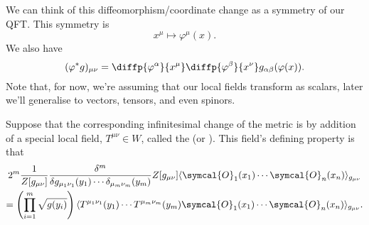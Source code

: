 \documentclass[fleqn]{NotesClass}
\newcommand{\quantumField}[1]{\symcal{#1}}
\DeclarePairedDelimiter{\correlator}{\langle}{\rangle}
\begin{document}
    We can think of this diffeomorphism/coordinate change as a symmetry of our QFT.
    This symmetry is
    \begin{equation}
        x^\mu \mapsto \varphi^\mu(x).
    \end{equation}
    We also have
    \begin{equation}
        (\varphi^*g)_{\mu\nu} = \diffp{\varphi^\alpha}{x^\mu} \diffp{\varphi^\beta}{x^\nu} g_{\alpha\beta}(\varphi(x)).
    \end{equation}
    Note that, for now, we're assuming that our local fields transform as scalars, later we'll generalise to vectors, tensors, and even spinors.
    
    Suppose that the corresponding infinitesimal change of the metric is by addition of a special local field, \(T^{\mu\nu} \in W\), called the  (or ).
    This field's defining property is that
    \begin{multline}
        \label{eqn:defining property of energy momentum tensor}
        2^m \frac{1}{Z[g_{\mu\nu}]} \frac{\delta^m}{\delta g_{\mu_1\nu_1}(y_1) \dotsm \delta_{\mu_m\nu_m}(y_m)} Z[g_{\mu\nu}]\correlator{\quantumField{O}_1(x_1) \dotsm \quantumField{O}_n(x_n)}_{g_{\mu\nu}}\\
        = \left( \prod_{i=1}^m \sqrt{g(y_i)} \right) \correlator{T^{\mu_1\nu_1}(y_1) \dotsm T^{\mu_m\nu_m}(y_m) \quantumField{O}_1(x_1) \dotsm \quantumField{O}_n(x_n)}_{g_{\mu\nu}}.
    \end{multline}
    
\end{document}

